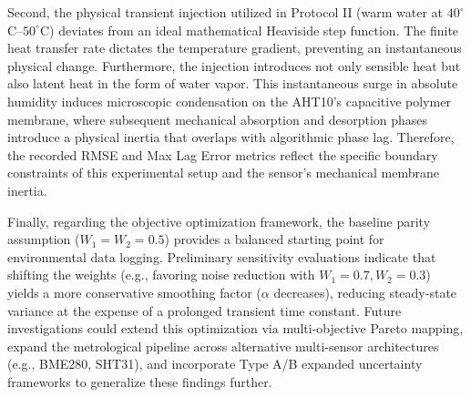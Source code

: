 Second, the physical transient injection utilized in Protocol II (warm water at $40^\circ$C--$50^\circ$C) deviates from an ideal mathematical Heaviside step function. 
The finite heat transfer rate dictates the temperature gradient, preventing an instantaneous physical change. 
Furthermore, the injection introduces not only sensible heat but also latent heat in the form of water vapor. 
This instantaneous surge in absolute humidity induces microscopic condensation on the AHT10's capacitive polymer membrane, where subsequent mechanical absorption and desorption phases introduce a physical inertia that overlaps with algorithmic phase lag. 
Therefore, the recorded RMSE and Max Lag Error metrics reflect the specific boundary constraints of this experimental setup and the sensor's mechanical membrane inertia. 

Finally, regarding the objective optimization framework, the baseline parity assumption ($W_1 = W_2 = 0.5$) provides a balanced starting point for environmental data logging. 
Preliminary sensitivity evaluations indicate that shifting the weights (e.g., favoring noise reduction with $W_1 = 0.7, W_2 = 0.3$) yields a more conservative smoothing factor ($\alpha$ decreases), reducing steady-state variance at the expense of a prolonged transient time constant. 
Future investigations could extend this optimization via multi-objective Pareto mapping, expand the metrological pipeline across alternative multi-sensor architectures (e.g., BME280, SHT31), and incorporate Type A/B expanded uncertainty frameworks to generalize these findings further.
